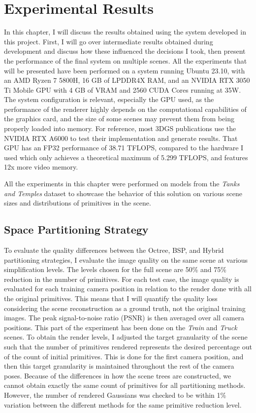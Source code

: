 \section{Experimental Results}

In this chapter, I will discuss the results obtained using the system developed in this project. First, I will go over intermediate results obtained during development and discuss how these influenced the decisions I took, then present the performance of the final system on multiple scenes. All the experiments that will be presented have been performed on a system running Ubuntu 23.10, with an AMD Ryzen 7 5800H, 16 GB of LPDDR4X RAM, and an NVIDIA RTX 3050 Ti Mobile GPU with 4 GB of VRAM and 2560 CUDA Cores running at 35W. The system configuration is relevant, especially the GPU used, as the performance of the renderer highly depends on the computational capabilities of the graphics card, and the size of some scenes may prevent them from being properly loaded into memory. For reference, most 3DGS publications use the NVIDIA RTX A6000 to test their implementation and generate results. That GPU has an FP32 performance of 38.71 TFLOPS, compared to the hardware I used which only achieves a theoretical maximum of 5.299 TFLOPS, and features 12x more video memory.

All the experiments in this chapter were performed on models from the \textit{Tanks and Temples} \cite{Knapitsch2017} dataset to showcase the behavior of this solution on various scene sizes and distributions of primitives in the scene.

\subsection{Space Partitioning Strategy}
To evaluate the quality differences between the Octree, BSP, and Hybrid partitioning strategies, I evaluate the image quality on the same scene at various simplification levels. The levels chosen for the full scene are 50\% and 75\% reduction in the number of primitives. For each test case, the image quality is evaluated for each training camera position in relation to the render done with all the original primitives. This means that I will quantify the quality loss considering the scene reconstruction as a ground truth, not the original training images. The peak signal-to-noise ratio (PSNR) is then averaged over all camera positions. This part of the experiment has been done on the \textit{Train} and \textit{Truck} scenes. To obtain the render levels, I adjusted the target granularity of the scene such that the number of primitives rendered represents the desired percentage out of the count of initial primitives. This is done for the first camera position, and then this target granularity is maintained throughout the rest of the camera poses. Because of the differences in how the scene trees are constructed, we cannot obtain exactly the same count of primitives for all partitioning methods. However, the number of rendered Gaussians was checked to be within 1\% variation between the different methods for the same primitive reduction level.

